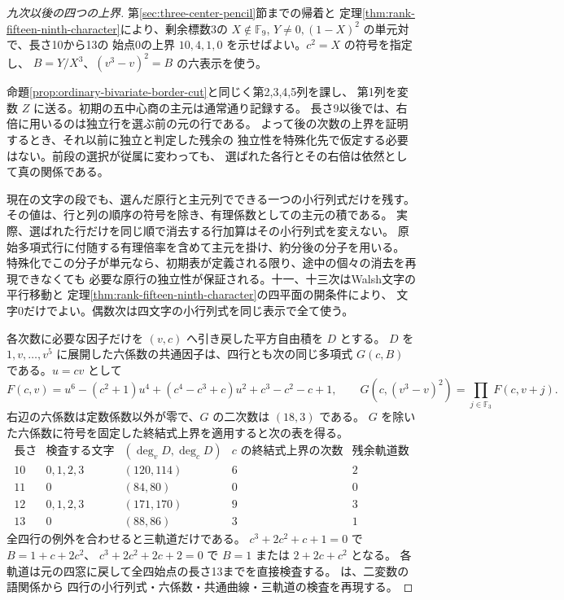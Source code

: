 \begin{proof}[九次以後の四つの上界]
第\ref{sec:three-center-pencil}節までの帰着と
定理\ref{thm:rank-fifteen-ninth-character}により、剰余標数3の
$X\notin\mathbb F_9$, $Y\ne0,(1-X)^2$ の単元対で、長さ10から13の
始点0の上界 $10,4,1,0$ を示せばよい。$c^2=X$ の符号を指定し、
$B=Y/X^3$、$(v^3-v)^2=B$ の六表示を使う。

命題\ref{prop:ordinary-bivariate-border-cut}と同じく第2,3,4,5列を課し、
第1列を変数 $Z$ に送る。初期の五中心商の主元は通常通り記録する。
長さ9以後では、右倍に用いるのは独立行を選ぶ前の元の行である。
よって後の次数の上界を証明するとき、それ以前に独立と判定した残余の
独立性を特殊化先で仮定する必要はない。前段の選択が従属に変わっても、
選ばれた各行とその右倍は依然として真の関係である。

現在の文字の段でも、選んだ原行と主元列でできる一つの小行列式だけを残す。
その値は、行と列の順序の符号を除き、有理係数としての主元の積である。
実際、選ばれた行だけを同じ順で消去する行加算はその小行列式を変えない。
原始多項式行に付随する有理倍率を含めて主元を掛け、約分後の分子を用いる。
特殊化でこの分子が単元なら、初期表が定義される限り、途中の個々の消去を再現できなくても
必要な原行の独立性が保証される。十一、十三次はWalsh文字の平行移動と
定理\ref{thm:rank-fifteen-ninth-character}の四平面の開条件により、
文字0だけでよい。偶数次は四文字の小行列式を同じ表示で全て使う。

各次数に必要な因子だけを $(v,c)$ へ引き戻した平方自由積を $D$ とする。
$D$ を $1,v,\ldots,v^5$ に展開した六係数の共通因子は、四行とも次の同じ多項式 $G(c,B)$
である。$u=cv$ として
\[
  F(c,v)=u^6-(c^2+1)u^4+(c^4-c^3+c)u^2+c^3-c^2-c+1,\qquad
  G(c,(v^3-v)^2)=\prod_{j\in\mathbb F_3}F(c,v+j).
\]
右辺の六係数は定数係数以外が零で、$G$ の二次数は $(18,3)$ である。
$G$ を除いた六係数に符号を固定した終結式上界を適用すると次の表を得る。
\[
\begin{array}{c|c|c|c|c}
 \text{長さ}&\text{検査する文字}&(\deg_v D,\deg_c D)&
  c\text{ の終結式上界の次数}&\text{残余軌道数}\\ \hline
 10&0,1,2,3&(120,114)&6&2\\
 11&0&(84,80)&0&0\\
 12&0,1,2,3&(171,170)&9&3\\
 13&0&(88,86)&3&1
\end{array}
\]
全四行の例外を合わせると三軌道だけである。
$c^3+2c^2+c+1=0$ で $B=1+c+2c^2$、
$c^3+2c^2+2c+2=0$ で $B=1$ または $2+2c+c^2$ となる。
各軌道は元の四窓に戻して全四始点の長さ13までを直接検査する。
 は、二変数の語関係から
四行の小行列式・六係数・共通曲線・三軌道の検査を再現する。
\end{proof}

